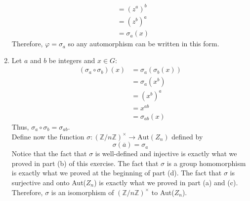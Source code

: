 \begin{solution}
\begin{enumerate}[label = \textbf{(\alph*)}]
\begin{align*}
            &= (z^a)^b \\
            &= (z^b)^a \\
            &= \sigma_a(x)
        \end{align*}
        Therefore, $\varphi = \sigma_a$ so any automorphism can be written in this form.
        \item Let $a$ and $b$ be integers and $x \in G$:
        \begin{align*}
            (\sigma_a \circ \sigma_b)(x) &= \sigma_a(\sigma_b(x)) \\
            &= \sigma_a(x^b) \\
            &= (x^b)^a \\
            &= x^{ab} \\
            &= \sigma_{ab}(x)
        \end{align*}
        Thus, $\sigma_a \circ \sigma_b = \sigma_{ab}$.\\
        Define now the function $\sigma : (\mathbb{Z}/n\mathbb{Z})^{\times} \to \text{Aut}(Z_n)$ defined by 
        $$\sigma(\overline{a}) = \sigma_a$$
        Notice that the fact that $\sigma$ is well-defined and injective is exactly what we proved in part (b) of this exercise. The fact that $\sigma$ is a group homomorphism is exactly what we proved at the beginning of part (d). The fact that $\sigma$ is surjective  and onto Aut($Z_n$) is exactly what we proved in part (a) and (c). Therefore, $\sigma$ is an isomorphism of $(\mathbb{Z}/n\mathbb{Z})^{\times}$ to Aut($Z_n$).
    \end{enumerate}
\end{solution}